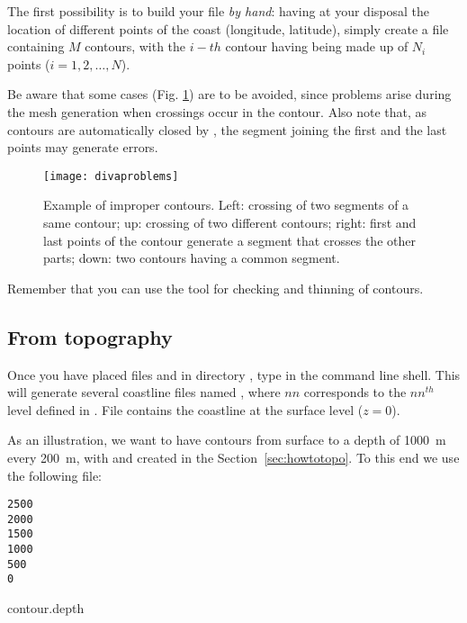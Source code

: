 The first possibility is to build your file \textit{by hand}: having at your disposal the location of different points of the coast (longitude, latitude), simply create a file containing $M$ contours, with the $i-th$ contour having being made up of $N_{i}$ points ($i=1,2,\ldots, N$). 

Be aware that some cases (Fig. \ref{divaprob}) are to be avoided, since problems arise during the mesh generation when crossings occur in the contour. Also note that, as contours are automatically closed by \diva, the segment joining the first and the last points may generate errors. 


\begin{figure}[H]
\centering
\parbox{.5\textwidth}{
\texttt{[image: divaproblems]}
}\parbox{.5\textwidth}{\caption[Example of improper contours.]{Example of improper contours. Left: crossing of two segments of a same contour; up: crossing of two different contours; right: first and last points of the contour generate a segment that crosses the other parts; down: two contours having a common segment.\label{divaprob}}
}
\end{figure}

Remember that you can use the tool  for checking and thinning of contours.


\subsection{From topography\label{sec:contourtopo}}


Once you have placed files  and  in directory , type  in the command line shell. This will generate several coastline files named , where $nn$ corresponds to the $nn^{th}$ level defined in . File  contains the coastline at the surface level ($z=0$).

As an illustration, we want to have contours from surface to a depth of \mbox{1000 m} every \mbox{200 m}, with  and  created in the Section~\ref{sec:howtotopo}. To this end we use the following file:

\begin{exfile}[htpb]
\begin{footnotesize}
\begin{verbatim}
2500
2000
1500
1000
500
0
\end{verbatim}
\end{footnotesize}
\caption{contour.depth\label{contourdepth}}
\end{exfile}

